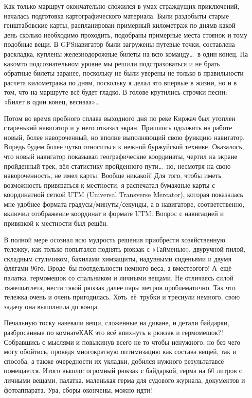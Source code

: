 Как только маршрут окончательно сложился в умах страждущих приключений, началась подготовка картографического материала. Были раздобыты старые генштабовские карты, распланирован примерный километраж по дням\mdash в какой день сколько необходимо проходить, подобраны примерные места стоянок и тому подобные вещи. В GPS\sdash навигатор были загружены путевые точки, составлена раскладка, куплены железнодорожные билеты на всю команду\ldots~в один конец. На каком\sdash то подсознательном уровне мы решили подстраховаться и не брать обратные билеты заранее, поскольку не были уверены не только в правильности расчета километража по дням, поскольку я делал это впервые в жизни, но и в том, что на маршруте всё будет гладко. В голове крутились строчки песни: «Билет в один конец, весна\sdash а\sdash а»\ldots
 
Потом во время пробного сплава выходного дня по реке Киржач был утоплен старенький навигатор и у него отказал экран. Пришлось одолжить на работе новый, более навороченный, но вполне выполняющий свою функцию навигатор. Впредь будем более чутко относиться к нежной буржуйской технике. Оказалось, что новый навигатор показывал географические координаты, чертил на экране пройденный трек, вёл статистику пройденного пути\ldots~но, несмотря на свою навороченность, не имел карты. Вообще никакой! Для того, чтобы иметь возможность привязаться к местности, я распечатал бумажные карты с координатной сеткой UTM (Universal Transverse Mercator), которая показалась мне удобнее формата градусы/минуты/секунды, а в навигаторе, соответственно, включил отображение координат в формате UTM. Вопрос с навигацией и привязкой к местности был решён.

В полной мере осознал всю мудрость решения приобрести хозяйственную тележку, как только попытался поднять рюкзак с «Тайменью», двуручной пилой, складным стульчиком, бахилами химзащиты, надувными сиденьями и двумя флягами 96\sdash го. Вроде~бы по\sdash отдельности немного веса, а вместе\mdash ого\sdash го! А~ещё палатка, гермомешок со спальником и личными вещами. Не отличаясь силой тяжелоатлета, нести такой рюкзак далее пары метров проблематично. Так что тележка очень и очень пригодилась. Хоть~её~трубки и треснули немного, свою задачу она выполнила до конца.

Печальную тоску навевали вещи, сложенные на диване, и детали байдарки, разбросанные по комнате\mdash КАК это всё впихнуть в рюкзак и гермомешок?! Собравшись с мыслями и повыкинув всего не то чтобы ненужного, но без чего могу обойтись, проведя многократную оптимизацию как состава вещей, так и способа, а также очередности их укладки, добился нужного результата\mdash всё помещается. Итого вышло: огромный рюкзак с байдаркой, герма на 60 литров с личными вещами, палатка, маленькая герма для судового журнала, документов и фотоаппарата. Ура, сборы окончены, можно идти!

